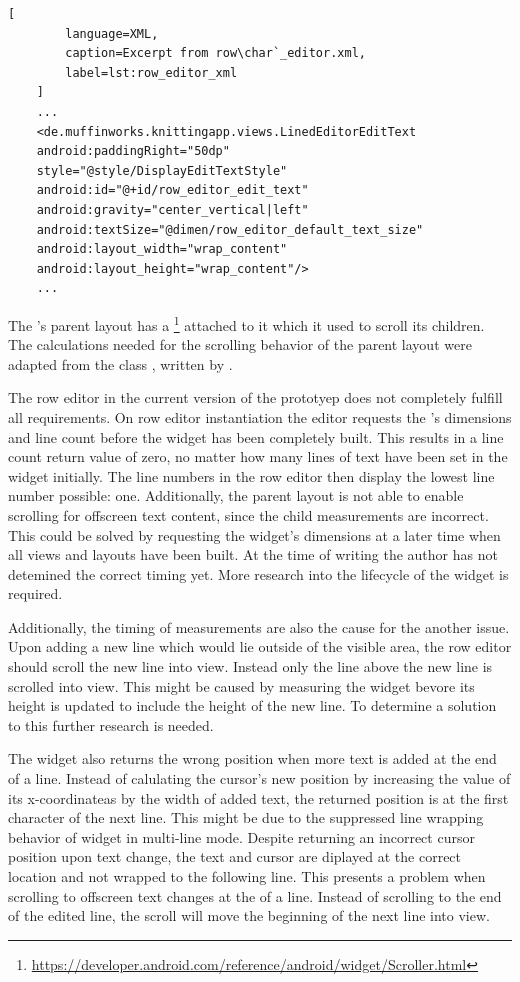 \begin{lstlisting}[
		language=XML, 
		caption=Excerpt from row\char`_editor.xml, 
		label=lst:row_editor_xml
	]
	...
    <de.muffinworks.knittingapp.views.LinedEditorEditText
    android:paddingRight="50dp"
    style="@style/DisplayEditTextStyle"
    android:id="@+id/row_editor_edit_text"
    android:gravity="center_vertical|left"
    android:textSize="@dimen/row_editor_default_text_size"
    android:layout_width="wrap_content"
    android:layout_height="wrap_content"/>
	...
\end{lstlisting}

The 's parent layout has a \footnote{\url{https://developer.android.com/reference/android/widget/Scroller.html}}  attached to it which it used to scroll its children. The calculations needed for the scrolling behavior of the parent layout were adapted from the class , written by \cite{clark2010}. 

The row editor in the current version of the prototyep does not completely fulfill all requirements. On row editor instantiation the editor requests the 's dimensions and line count before the widget has been completely built. This results in a line count return value of zero, no matter how many lines of text have been set in the widget initially. The line numbers in the row editor then display the lowest line number possible: one. Additionally, the parent layout is not able to enable scrolling for offscreen text content, since the child measurements are incorrect. This could be solved by requesting the  widget's dimensions at a later time when all views and layouts have been built. At the time of writing the author has not detemined the correct timing yet. More research into the lifecycle of the widget is required.

Additionally, the timing of measurements are also the cause for the another issue. Upon adding a new line which would lie outside of the visible area, the row editor should scroll the new line into view. Instead only the line above the new line is scrolled into view. This might be caused by measuring the  widget bevore its height is updated to include the height of the new line. To determine a solution to this further research is needed.

The  widget also returns the wrong position when more text is added at the end of a line. Instead of calulating the cursor's new position by increasing the value of its x-coordinateas by the width of added text, the returned position is at the first character of the next line. This might be due to the suppressed line wrapping behavior of  widget in multi-line mode. Despite returning an incorrect cursor position upon text change, the text and cursor are diplayed at the correct location and not wrapped to the following line. This presents a problem when scrolling to offscreen text changes at the of a line. Instead of scrolling to the end of the edited line, the scroll will move the beginning of the next line into view.

